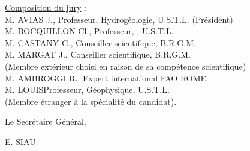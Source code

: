 
\uline{Composition du jury} :\\
M. AVIAS J., Professeur, Hydrogéologie, U.S.T.L. (Président)\\
M. BOCQUILLON Cl., Professeur, , U.S.T.L.\\
M. CASTANY G., Conseiller scientifique, B.R.G.M.\\
M. MARGAT J., Conseiller scientifique, B.R.G.M.\\
(Membre extérieur choisi en raison de sa compétence scientifique)\\
M. AMBROGGI R., Expert international FAO ROME\\
M. LOUIS\qquad Professeur, Géophysique, U.S.T.L.\\
(Membre étranger à la spécialité du candidat).


Le Secrétaire Général,


\uline{E. SIAU}

